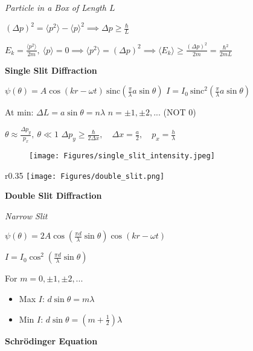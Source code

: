 \documentclass[twocolumn]{article}
\begin{document}
\textit{Particle in a Box of Length $L$}

$(\Delta p)^2 = \langle p^2 \rangle - \langle p \rangle^2 \implies \Delta p \geq \frac{\hbar}{L}$

$E_k = \frac{\langle p^2 \rangle}{2m},\ \langle p \rangle = 0 \implies \langle p^2 \rangle = (\Delta p)^2 \implies \langle E_k \rangle \geq \frac{(\Delta p)^2}{2m} = \frac{\hbar^2}{2mL}$

\dotfill

\textbf{Single Slit Diffraction}

$\psi(\theta) = A \cos (kr - \omega t)\ \text{sinc} \left( \frac{\pi}{\lambda} a \sin\theta \right)$ \hfill $I = I_0\ \text{sinc}^2 \left( \frac{\pi}{\lambda} a \sin\theta \right)$

At min: $\Delta L = a \sin \theta = n \lambda$ \hfill $n = \pm 1, \pm 2, ...$ (NOT 0)

$\theta \approx \frac{\Delta p_y}{p_x},\ \theta \ll 1$ \hfill $\Delta p_y \geq \frac{\hbar}{2 \Delta x},\quad \Delta x = \frac{a}{2},\quad p_x = \frac{h}{\lambda}$

\begin{figure}[h]
    \centering
    \texttt{[image: Figures/single\_slit\_intensity.jpeg]}
\end{figure}

\vspace{-.5em}
\dotfill

\begin{wrapfigure}[7]{r}{0.35\columnwidth}
    \texttt{[image: Figures/double\_slit.png]}
\end{wrapfigure}

\textbf{Double Slit Diffraction}

\textit{Narrow Slit}

$\psi(\theta) = 2A \cos(\frac{\pi d}{\lambda} \sin \theta) \cos(kr - \omega t)$

$I = I_0 \cos^2 \left( \frac{\pi d}{\lambda} \sin \theta \right)$

For $m=0, \pm 1, \pm 2, ...$ \vspace{-.5em}
\begin{itemize}
    \item Max $I$: $d \sin \theta = m\lambda$
    \item Min $I$: $d \sin \theta = \left( m + \frac{1}{2} \right) \lambda$
\end{itemize}


\newpage


\textbf{Schr\"{o}dinger Equation}
\end{document}
